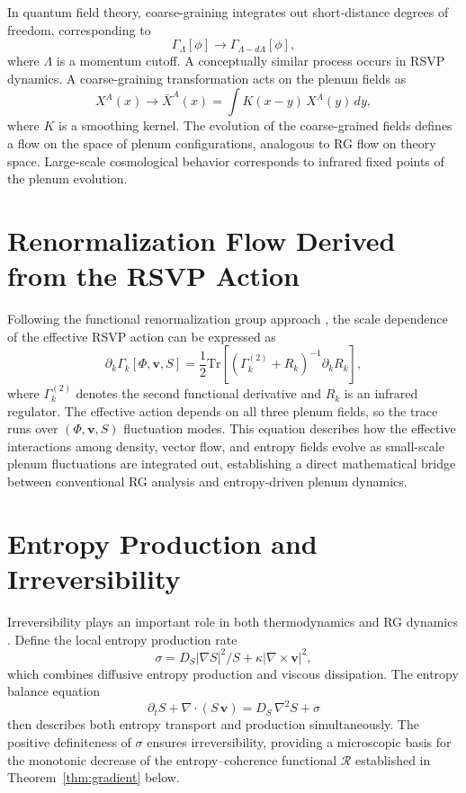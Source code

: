 \documentclass[12pt,a4paper]{article}
\theoremstyle{plain}
\theoremstyle{definition}
\theoremstyle{remark}
\begin{document}
In quantum field theory, coarse-graining integrates out short-distance
degrees of freedom, corresponding to
\begin{equation}
\Gamma_\Lambda[\phi] \rightarrow \Gamma_{\Lambda - d\Lambda}[\phi],
\end{equation}
where $\Lambda$ is a momentum cutoff. A conceptually similar process
occurs in RSVP dynamics. A coarse-graining transformation acts on the
plenum fields as
\begin{equation}
X^A(x) \rightarrow \bar{X}^A(x) = \int K(x-y)\,X^A(y)\,dy,
\end{equation}
where $K$ is a smoothing kernel. The evolution of the coarse-grained
fields defines a flow on the space of plenum configurations, analogous
to RG flow on theory space. Large-scale cosmological behavior
corresponds to infrared fixed points of the plenum evolution.

\section{Renormalization Flow Derived from the RSVP Action}

Following the functional renormalization group approach
\cite{Reuter1998,ZinnJustin}, the scale dependence of the effective
RSVP action can be expressed as
\begin{equation}
\partial_k \Gamma_k[\Phi,\mathbf{v},S] =
\frac{1}{2}
\mathrm{Tr}\left[
(\Gamma_k^{(2)} + R_k)^{-1}\partial_k R_k
\right],
\end{equation}
where $\Gamma_k^{(2)}$ denotes the second functional derivative and
$R_k$ is an infrared regulator. The effective action depends on all
three plenum fields, so the trace runs over $(\Phi,\mathbf{v},S)$
fluctuation modes. This equation describes how the effective
interactions among density, vector flow, and entropy fields evolve as
small-scale plenum fluctuations are integrated out, establishing a
direct mathematical bridge between conventional RG analysis and
entropy-driven plenum dynamics.

\section{Entropy Production and Irreversibility}

Irreversibility plays an important role in both thermodynamics and RG
dynamics \cite{Jaynes1957,Jaynes1957b,Callen}. Define the local entropy
production rate
\begin{equation}
\sigma = D_S|\nabla S|^2 / S + \kappa|\nabla \times \mathbf{v}|^2,
\end{equation}
which combines diffusive entropy production and viscous dissipation.
The entropy balance equation
\begin{equation}
\partial_t S + \nabla \cdot (S\,\mathbf{v}) = D_S\,\nabla^2 S + \sigma
\end{equation}
then describes both entropy transport and production simultaneously.
The positive definiteness of $\sigma$ ensures irreversibility,
providing a microscopic basis for the monotonic decrease of the
entropy--coherence functional $\mathcal{R}$ established in
Theorem~\ref{thm:gradient} below.
\end{document}
